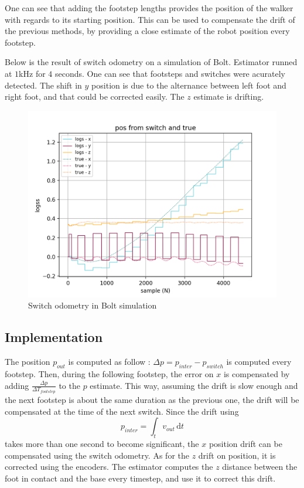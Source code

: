 \documentclass[a4paper,10pt]{article}
\begin{document}
One can see that adding the footstep lengths provides the position of the walker with regards to its starting position. This can be used to compensate the drift of the previous methods, by providing a close estimate of the robot position every footstep.


Below is the result of switch odometry on a simulation of Bolt. Estimator runned at $1$kHz for $4$ seconds. One can see that footsteps and switches were acurately detected. The shift in $y$ position is due to the alternance between left foot and right foot, and that could be corrected easily. The $z$ estimate is drifting.



\begin{figure}[H]
\centering
  \includegraphics[width=\linewidth, angle=0, scale=0.7]{./images/switch_odometry.png}
  \caption{Switch odometry in Bolt simulation}
\end{figure}

\subsection{Implementation}

The position $p_{out}$ is computed as follow : $\Delta p = p_{inter} - p_{switch}$ is computed every footstep. Then, during the following footstep, the error on $x$ is compensated by adding $\frac{\Delta p}{\Delta T_{footstep}}$ to the $p$ estimate. This way, assuming the drift is slow enough and the next footstep is about the same duration as the previous one, the drift will be compensated at the time of the next switch. Since the drift using 
$$ p_{inter} = \int_t v_{out} \, \mathrm{d}t $$
takes more than one second to become significant, the $x$ position drift can be compensated using the switch odometry.
As for the $z$ drift on position, it is corrected using the encoders. The estimator computes the $z$ distance between the foot in contact and the base every timestep, and use it to correct this drift.
\end{document}
